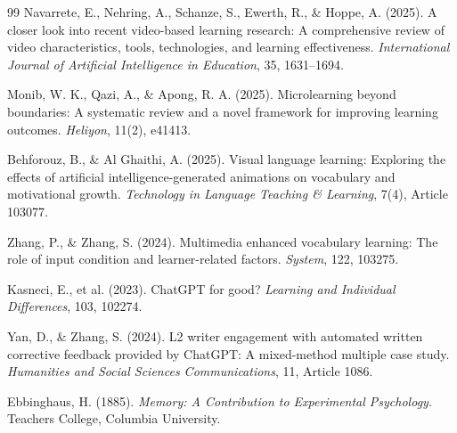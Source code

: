 \documentclass[12pt,a4paper]{ctexart}
\begin{document}
\begin{thebibliography}{99}
Navarrete, E., Nehring, A., Schanze, S., Ewerth, R., \& Hoppe, A. (2025). A closer look into recent video-based learning research: A comprehensive review of video characteristics, tools, technologies, and learning effectiveness. \textit{International Journal of Artificial Intelligence in Education}, 35, 1631--1694.

Monib, W. K., Qazi, A., \& Apong, R. A. (2025). Microlearning beyond boundaries: A systematic review and a novel framework for improving learning outcomes. \textit{Heliyon}, 11(2), e41413.

Behforouz, B., \& Al Ghaithi, A. (2025). Visual language learning: Exploring the effects of artificial intelligence-generated animations on vocabulary and motivational growth. \textit{Technology in Language Teaching \& Learning}, 7(4), Article 103077.

Zhang, P., \& Zhang, S. (2024). Multimedia enhanced vocabulary learning: The role of input condition and learner-related factors. \textit{System}, 122, 103275.

Kasneci, E., et al. (2023). ChatGPT for good? \textit{Learning and Individual Differences}, 103, 102274.

Yan, D., \& Zhang, S. (2024). L2 writer engagement with automated written corrective feedback provided by ChatGPT: A mixed-method multiple case study. \textit{Humanities and Social Sciences Communications}, 11, Article 1086.

Ebbinghaus, H. (1885). \textit{Memory: A Contribution to Experimental Psychology}. Teachers College, Columbia University.

\end{thebibliography}
\end{document}
